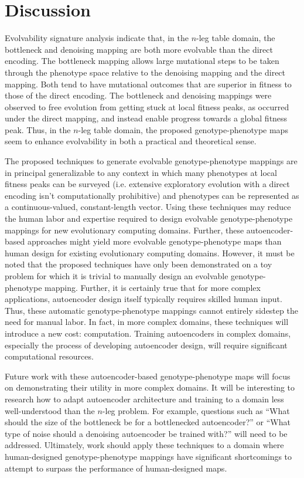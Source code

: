 \section{Discussion} \label{sec:discussion}

Evolvability signature analysis indicate that, in the $n$-leg table domain, the bottleneck and denoising mapping are both more evolvable than the direct encoding.
The bottleneck mapping allows large mutational steps to be taken through the phenotype space relative to the denoising mapping and the direct mapping.
Both tend to have mutational outcomes that are superior in fitness to those of the direct encoding.
The bottleneck and denoising mappings were observed to free evolution from getting stuck at local fitness peaks, as occurred under the direct mapping, and instead enable progress towards a global fitness peak.
Thus, in the $n$-leg table domain, the proposed genotype-phenotype maps seem to enhance evolvability in both a practical and theoretical sense.

The proposed techniques to generate evolvable genotype-phenotype mappings are in principal generalizable to any context in which many phenotypes at local fitness peaks can be surveyed (i.e. extensive exploratory evolution with a direct encoding isn't computationally prohibitive) and phenotypes can be represented as a continuous-valued, constant-length vector.
Using these techniques may reduce the human labor and expertise required to design evolvable genotype-phenotype mappings for new evolutionary computing domains.
Further, these autoencoder-based approaches might yield more evolvable genotype-phenotype maps than human design for existing evolutionary computing domains.
However, it must be noted that the proposed techniques have only been demonstrated on a toy problem for which it is trivial to manually design an evolvable genotype-phenotype mapping.
Further, it is certainly true that for more complex applications, autoencoder design itself typically requires skilled human input.
Thus, these automatic genotype-phenotype mappings cannot entirely sidestep the need for manual labor.
In fact, in more complex domains, these techniques will introduce a new cost: computation.
Training autoencoders in complex domains, especially the process of developing autoencoder design, will require significant computational resources.

Future work with these autoencoder-based genotype-phenotype maps will focus on demonstrating their utility in more complex domains.
It will be interesting to research how to adapt autoencoder architecture and training to a domain less well-understood than the $n$-leg problem.
For example, questions such as ``What should the size of the bottleneck be for a bottlenecked autoencoder?'' or ``What type of noise should a denoising autoencoder be trained with?'' will need to be addressed.
Ultimately, work should apply these techniques to a domain where human-designed genotype-phenotype mappings have significant shortcomings to attempt to surpass the performance of human-designed maps.
